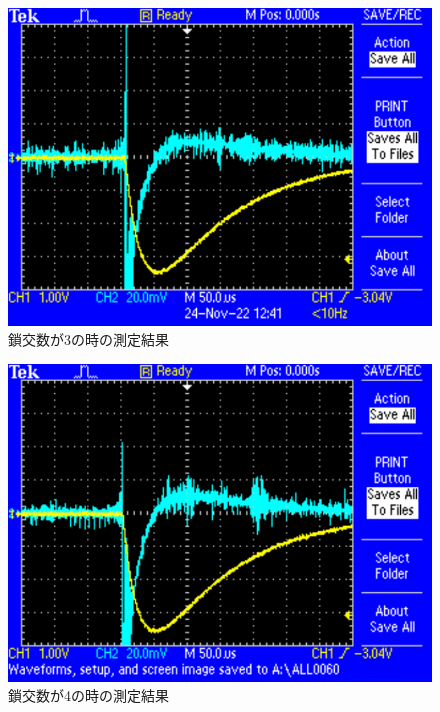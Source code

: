 \begin{figure}[H]
    \centering
    \includegraphics[scale=0.5]{rogowskii-3.pdf}
    \caption{鎖交数が3の時の測定結果}
\end{figure}

\begin{figure}[H]
    \centering
    \includegraphics[scale=0.5]{rogowskii-4.pdf}
    \caption{鎖交数が4の時の測定結果}
\end{figure}


